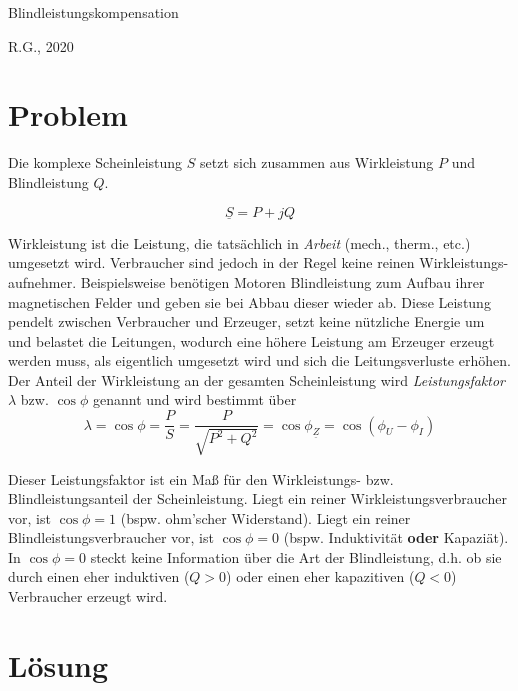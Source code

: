 \documentclass{article}
\begin{document}
\begin{center}
  \Large Blindleistungskompensation
\end{center}

\begin{flushright}
  R.G., 2020
\end{flushright}

\section{Problem}

Die komplexe Scheinleistung $S$ setzt sich zusammen aus Wirkleistung $P$ und Blindleistung $Q$.

\[ \underline{S} = P + j Q \]

Wirkleistung ist die Leistung, die tatsächlich in \emph{Arbeit} (mech., therm., etc.) umgesetzt wird. Verbraucher sind jedoch in der Regel keine reinen Wirkleistungs-aufnehmer. Beispielsweise benötigen Motoren Blindleistung zum Aufbau ihrer magnetischen Felder und geben sie bei Abbau dieser wieder ab. Diese Leistung pendelt zwischen Verbraucher und Erzeuger, setzt keine nützliche Energie um und belastet die Leitungen, wodurch eine höhere Leistung am Erzeuger erzeugt werden muss, als eigentlich umgesetzt wird und sich die Leitungsverluste erhöhen.\\

Der Anteil der Wirkleistung an  der gesamten Scheinleistung wird \emph{Leistungsfaktor} $\lambda$ bzw. $\cos{\phi}$ genannt und wird bestimmt über\\

\[ \lambda = \cos{\phi} = \frac{P}{S} = \frac{P}{\sqrt{P^{2} + Q^{2}}} = \cos{\phi_{{\underline{Z}}}} = \cos{(\phi_{U} - \phi_{I})}\]

Dieser Leistungsfaktor ist ein Maß für den Wirkleistungs- bzw. Blindleistungsanteil der Scheinleistung. Liegt ein reiner Wirkleistungsverbraucher vor, ist $\cos{\phi} = 1$ (bspw. ohm'scher Widerstand). Liegt ein reiner Blindleistungsverbraucher vor, ist $\cos{\phi} = 0$ (bspw. Induktivität {\bfseries{oder}} Kapaziät). In $\cos{\phi} = 0$ steckt keine Information über die Art der Blindleistung, d.h. ob sie durch einen eher induktiven ($Q > 0$) oder einen eher kapazitiven ($Q < 0$) Verbraucher erzeugt wird.\\

\section{Lösung}
\end{document}
